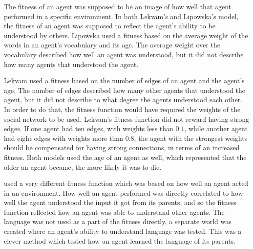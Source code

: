 The fitness of an agent was supposed to be an image of how well that agent performed in a specific environment. In both Lekvam’s and Lipowska’s model, the fitness of an agent was supposed to reflect the agent’s ability to be understood by others. Lipowska used a fitness based on the average weight of the words in an agent’s vocabulary and its age. The average weight over the vocabulary described how well an agent was understood, but it did not describe how many agents that understood the agent. 

Lekvam used a fitness based on the number of edges of an agent and the agent’s age. The number of edges described how many other agents that understood the agent, but it did not describe to what degree the agents understood each other. In order to do that, the fitness function would have required the weights of the social network to be used. Lekvam’s fitness function did not reward having strong edges. If one agent had ten edges, with weights less than $0.1$, while another agent had eight edges with weights more than $0.8$, the agent with the strongest weights should be compensated for having strong connections, in terms of an increased fitness. Both models used the age of an agent as well, which represented that the older an agent became, the more likely it was to die. 

\citet{munroe2002learning} used a very different fitness function which was based on how well an agent acted in an environment. How well an agent performed was directly correlated to how well the agent understood the input it got from its parents, and so the fitness function reflected how an agent was able to understand other agents. The language was not used as a part of the fitness directly, a separate world was created where an agent's ability to understand language was tested. This was a clever method which tested how an agent learned the language of its parents.



